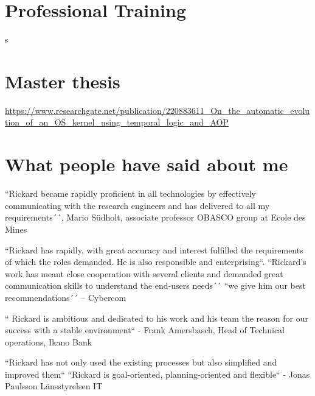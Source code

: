 \documentclass[11pt,a4paper,sans]{moderncv}
\begin{document}
\section{Professional Training}
s

\section{Master thesis}
\url{https://www.researchgate.net/publication/220883611\_On_the_automatic_evolution_of_an_OS_kernel_using_temporal_logic_and_AOP}

\section{What people have said about me}
\large 

\begin{quotelist}
    \item
    ``Rickard became rapidly proficient in all technologies by effectively communicating with the research engineers and has delivered to all my requirements´´,
      Mario Südholt, associate professor OBASCO group at Ecole des Mines 
\item
        ``Rickard has rapidly, with great accuracy and interest fulfilled the requirements of which the roles demanded.  He is also responsible and enterprising``. ``Rickard’s work has meant close cooperation with several clients and demanded great communication skills to understand the end-users needs´´ 
        ``we give him our best recommendations´´ – Cybercom 
\item     
        `` Rickard is ambitious and dedicated to his work and his team the reason for our success with a stable environment``  - Frank Amersbasch, Head of Technical operations, Ikano Bank 
\item  ``Rickard has not only used the existing processes but also simplified and improved them`` ``Rickard is goal-oriented, planning-oriented and flexible``  - Jonas Paulsson Länsstyrelsen IT 
       
  \end{quotelist}
\end{document}
